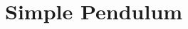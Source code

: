 \documentclass[12pt,compress,aspectratio=169]{beamer}
\begin{document}
%
%
%
%



\section{Simple Pendulum}
\end{document}
